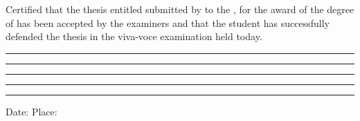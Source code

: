 
Certified that the thesis entitled \textbf{} submitted by \textbf{\ThesisAuthorName} to the \ThesisInstitute, for the award of the degree of \textbf{\ThesisDegree} has been accepted by the examiners and that the student has successfully defended the thesis in the viva-voce examination held today.

\vspace{2.0cm}
\noindent
\begin{minipage}[t]{0.45\textwidth}
    \centering
    \rule{\linewidth}{0.6pt}\par
\end{minipage}
\hfill
\begin{minipage}[t]{0.45\textwidth}
    \centering
    \rule{\linewidth}{0.6pt}\par
\end{minipage}

\vspace{2.2cm}
\noindent
\begin{minipage}[t]{0.45\textwidth}
    \centering
    \rule{\linewidth}{0.6pt}\par
\end{minipage}
\hfill
\begin{minipage}[t]{0.45\textwidth}
    \centering
    \rule{\linewidth}{0.6pt}\par
\end{minipage}

\vspace{2.2cm}
\noindent
\begin{minipage}[t]{0.45\textwidth}
    \centering
    \rule{\linewidth}{0.6pt}\par
\end{minipage}

\vfill
\noindent Date: \ThesisApprovalDate \hfill Place: \ThesisPlace
\clearpage

